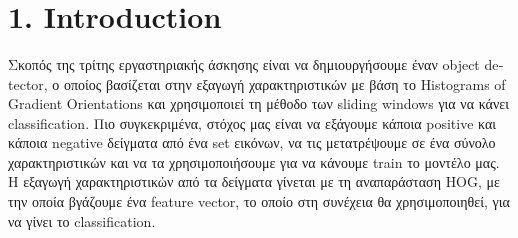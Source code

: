 \documentclass{article}
\newcommand{\tl}[1]{\textlatin{#1}}
\begin{document}
\begin{titlepage}
		\begin{minipage}{0.6\textwidth}
			
			\begin{flushright} \large
				\theauthor\\
				
			\end{flushright}
			
			\begin{flushright} \large
				\tl{\thedate}\\
				
			\end{flushright}
			
		\end{minipage}\\[2 cm]
		
	\end{titlepage}	
	\newpage
	\section*{1. \tl{Introduction}}
	Σκοπός της τρίτης εργαστηριακής άσκησης είναι να δημιουργήσουμε έναν \tl{object detector}, ο οποίος βασίζεται στην εξαγωγή χαρακτηριστικών με βάση 
	το \tl{Histograms of Gradient Orientations} και χρησιμοποιεί τη μέθοδο των \tl{sliding windows} για να κάνει \tl{classification}. Πιο συγκεκριμένα, 
	στόχος μας είναι να εξάγουμε κάποια \tl{positive} και κάποια \tl{negative} δείγματα από ένα \tl{set} εικόνων, να τις μετατρέψουμε σε ένα σύνολο 
	χαρακτηριστικών και να τα χρησιμοποιήσουμε για να κάνουμε \tl{train} το μοντέλο μας. Η εξαγωγή χαρακτηριστικών από τα δείγματα γίνεται με τη 
	αναπαράσταση \tl{HOG}, με την οποία βγάζουμε ένα \tl{feature vector}, το οποίο στη συνέχεια θα χρησιμοποιηθεί, για να γίνει το \tl{classification}.\\\\
\end{document}
